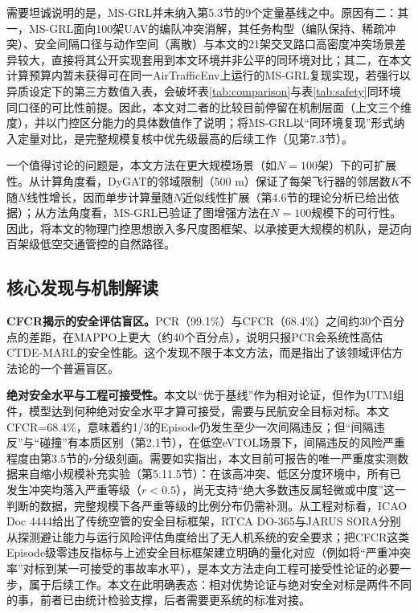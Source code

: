 \documentclass[12pt,a4paper,UTF8]{ctexart}
\begin{document}
需要坦诚说明的是，MS-GRL并未纳入第5.3节的9个定量基线之中。原因有二：其一，MS-GRL面向100架UAV的编队冲突消解，其任务构型（编队保持、稀疏冲突）、安全间隔口径与动作空间（离散）与本文的21架交叉路口高密度冲突场景差异较大，直接将其公开实现套用到本文环境并非公平的同环境对比；其二，在本文计算预算内暂未获得可在同一AirTrafficEnv上运行的MS-GRL复现实现，若强行以异质设定下的第三方数值入表，会破坏表\ref{tab:comparison}与表\ref{tab:safety}同环境同口径的可比性前提。因此，本文对二者的比较目前停留在机制层面（上文三个维度），并以门控区分能力的具体数值作了说明；将MS-GRL以“同环境复现”形式纳入定量对比，是完整规模复核中优先级最高的后续工作（见第7.3节）。

一个值得讨论的问题是，本文方法在更大规模场景（如$N=100$架）下的可扩展性。从计算角度看，DyGAT的邻域限制（500 m）保证了每架飞行器的邻居数$K$不随$N$线性增长，因而单步计算量随$N$近似线性扩展（第4.6节的理论分析已给出依据）；从方法角度看，MS-GRL已验证了图增强方法在$N=100$规模下的可行性。因此，将本文的物理门控思想嵌入多尺度图框架、以承接更大规模的机队，是迈向百架级低空交通管控的自然路径。

\subsection{核心发现与机制解读}

\textbf{CFCR揭示的安全评估盲区。}PCR（99.1\%）与CFCR（68.4\%）之间约30个百分点的差距，在MAPPO上更大（约40个百分点），说明只报PCR会系统性高估CTDE-MARL的安全性能。这个发现不限于本文方法，而是指出了该领域评估方法论的一个普遍盲区。

\textbf{绝对安全水平与工程可接受性。}本文以“优于基线”作为相对论证，但作为UTM组件，模型达到何种绝对安全水平才算可接受，需要与民航安全目标对标。本文CFCR=68.4\%，意味着约1/3的Episode仍发生至少一次间隔违反；但“间隔违反”与“碰撞”有本质区别（第2.1节），在低空eVTOL场景下，间隔违反的风险严重程度由第3.5节的$r$分级刻画。需要如实指出，本文目前可报告的唯一严重度实测数据来自缩小规模补充实验（第5.11.5节）：在该高冲突、低区分度环境中，所有已发生冲突均落入严重等级（$r<0.5$），尚无支持“绝大多数违反属轻微或中度”这一判断的数据，完整规模下各严重等级的比例分布仍需补测。从工程对标看，ICAO Doc 4444\cite{ref49}给出了传统空管的安全目标框架，RTCA DO-365\cite{ref51}与JARUS SORA\cite{ref50}分别从探测避让能力与运行风险评估角度给出了无人机系统的安全要求；把CFCR这类Episode级零违反指标与上述安全目标框架建立明确的量化对应（例如将“严重冲突率”对标到某一可接受的事故率水平），是本文方法走向工程可接受性论证的必要一步，属于后续工作。本文在此明确表态：相对优势论证与绝对安全对标是两件不同的事，前者已由统计检验支撑，后者需要更系统的标准对接。
\end{document}
